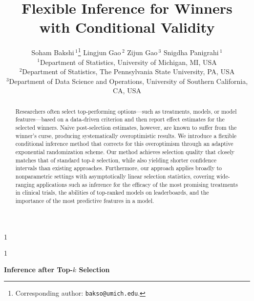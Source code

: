 \documentclass[12pt]{article}
\newcommand{\blind}{1}
\begin{document}

\date{}

\def\spacingset#1{\renewcommand{\baselinestretch}%
{#1}\small\normalsize} \spacingset{1}


\blind
{
  \title{\bf Flexible Inference for Winners with Conditional Validity}
\author{
 Soham Bakshi\,$^{1}$\thanks{Corresponding author: \texttt{bakso@umich.edu}.}
 \quad Lingjun Gao\,$^{2}$
 \quad Zijun Gao\,$^{3}$
 \quad Snigdha Panigrahi\,$^{1}$
 \\[6pt]
 {\small $^{1}$Department of Statistics, University of Michigan, MI, USA}\\
 {\small $^{2}$Department of Statistics, The Pennsylvania State University, PA, USA}\\
 {\small $^{3}$Department of Data Science and Operations, University of Southern California, CA, USA}
}
  \maketitle
} \fi

\blind
{
  \bigskip
  \bigskip
  \bigskip
  \begin{center}
    {\LARGE\bf Inference after Top-$k$ Selection}
\end{center}
  \medskip
}\fi



\begin{abstract}
Researchers often select top-performing options---such as treatments, models, or model features---based on a data-driven criterion and then report effect estimates for the selected winners. 
Naive post-selection estimates, however, are known to suffer from the winner’s curse, producing systematically overoptimistic results.
We introduce a flexible conditional inference method that corrects for this overoptimism through an adaptive exponential randomization scheme.
Our method achieves selection quality that closely matches that of standard top-$k$ selection, while also yielding shorter confidence intervals than existing approaches.
Furthermore, our approach applies broadly to nonparametric settings with asymptotically linear selection statistics, covering wide-ranging applications such as inference for the efficacy of the most promising treatments in clinical trials, the abilities of top-ranked models on leaderboards, and the importance of the most predictive features in a model.
\end{abstract}
\end{document}
